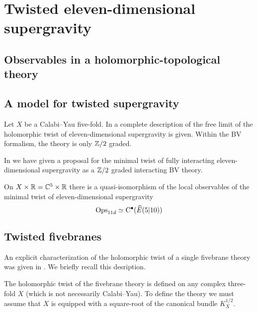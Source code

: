 \documentclass[11pt]{amsart}
\begin{document}
\section{Twisted eleven-dimensional supergravity}

\subsection{Observables in a holomorphic-topological theory}

\subsection{A model for twisted supergravity}

Let $X$ be a Calabi--Yau five-fold. 
In \cite{SWspinor} a complete description of the free limit of the holomorphic twist of eleven-dimensional supergravity is given. 
Within the BV formalism, the theory is only $\mathbb{Z}/2$ graded.

In \cite{RSW} we have given a proposal for the minimal twist of fully interacting eleven-dimensional supergravity as a $\mathbb{Z}/2$ graded interacting BV theory. 

\begin{thm}
On $X \times \mathbb{R} = \mathbb{C}^5 \times \mathbb{R}$ there is a quasi-isomorphism of the local observables of the minimal twist of eleven-dimensional supergravity 
\[
{\rm Ops}_{11d} \simeq {\rm C}^\bullet(\widehat{E}(5|10)) 
\]
\end{thm}


\subsection{Twisted fivebranes} 


\parsec

\parsec[s:coupling]

\parsec[s:single]

An explicit characterization of the holomorphic twist of a single fivebrane theory was given in \cite{SWtensor}. 
We briefly recall this desription. 

\parsec[]

The holomorphic twist of the fivebrane theory is defined on any complex three-fold $X$ (which is not necessarily Calabi--Yau).
To define the theory we must assume that $X$ is equipped with a square-root of the canonical bundle $K_X^{1/2}$. 
\end{document}
